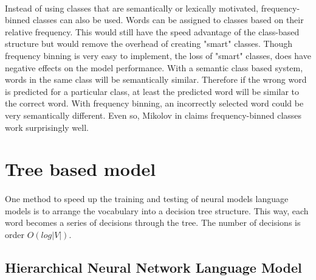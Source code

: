 \paragraph{}
Instead of using classes that are semantically or lexically motivated, frequency-binned classes can also be used. Words can be assigned to classes based on their relative frequency. This would still have the speed advantage of the class-based structure but would remove the overhead of creating "smart" classes. Though frequency binning is very easy to implement, the loss of "smart" classes, does have negative effects on the model performance. With a semantic class based system, words in the same class will be semantically similar. Therefore if the wrong word is predicted for a particular class, at least the predicted word will be similar to the correct word. With frequency binning, an incorrectly selected word could be very semantically different. Even so, Mikolov in \cite{Mikolov2012} claims frequency-binned classes work surprisingly well. 

\section{Tree based model}
\paragraph{}
One method to speed up the training and testing of neural models language models is to arrange the vocabulary into a decision tree structure. This way, each word becomes a series of decisions through the tree. The number of decisions is order $O(log|V|)$.

\subsection{Hierarchical Neural Network Language Model}

